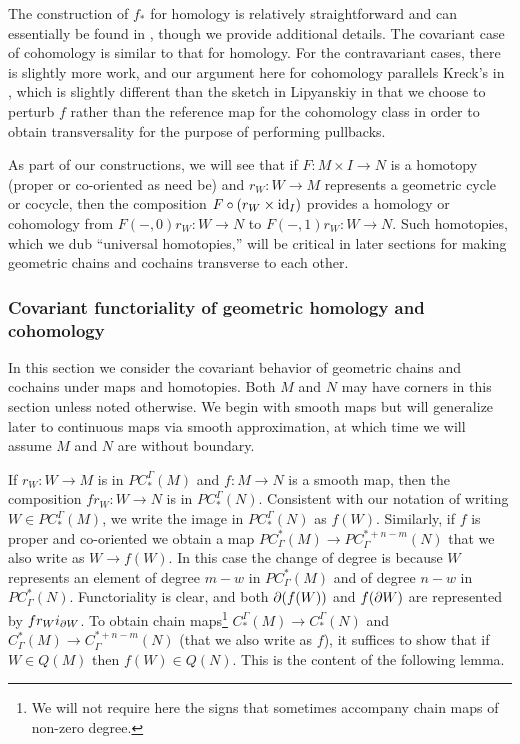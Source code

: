 The construction of $f_*$ for homology is relatively straightforward and can essentially be found in \cite[Section 6]{Lipy14}, though we provide additional details.
The covariant case of cohomology is similar to that for homology.
For the contravariant cases, there is slightly more work, and our argument here for cohomology parallels Kreck's in \cite{Krec10}, which is slightly different than the sketch in Lipyanskiy \cite[Section 6]{Lipy14} in that we choose to perturb $f$ rather than the reference map for the cohomology class in order to obtain transversality for the purpose of performing pullbacks.

As part of our constructions, we will see that if $F \colon M \times I \to N$ is a homotopy (proper or co-oriented as need be) and $r_W \colon W \to M$ represents a geometric cycle or cocycle, then the composition $F \circ (r_W \times \mathrm{id}_I)$ provides a homology or cohomology from $F(-,0)r_W \colon W \to N$ to $F(-,1)r_W \colon W \to N$.
Such homotopies, which we dub ``universal homotopies,'' will be critical in later sections for making geometric chains and cochains transverse to each other.

\subsubsection{Covariant functoriality of geometric homology and cohomology}\label{S: covariant functoriality}

In this section we consider the covariant behavior of geometric chains and cochains under maps and homotopies.
Both $M$ and $N$ may have corners in this section unless noted otherwise.
We begin with smooth maps but will generalize later to continuous maps via smooth approximation, at which time we will assume $M$ and $N$ are without boundary.

If $r_W \colon W \to M$ is in $PC_*^\Gamma(M)$ and $f \colon M \to N$ is a smooth map, then the composition $fr_W \colon W \to N$ is in $PC^\Gamma_*(N)$.
Consistent with our notation of writing $W \in PC_*^\Gamma(M)$, we write the image in $PC_*^\Gamma(N)$ as $f(W)$.
Similarly, if $f$ is proper and co-oriented we obtain a map $PC^*_\Gamma(M) \to PC^{*+n-m}_\Gamma(N)$ that we also write as $W \to f(W)$.
In this case the change of degree is because $W$ represents an element of degree $m-w$ in $PC^*_\Gamma(M)$ and of degree $n-w$ in $PC^{*}_\Gamma(N)$.
Functoriality is clear, and both $\partial(f(W))$ and $f(\partial W)$ are represented by $fr_Wi_{\partial W}$.
To obtain chain maps\footnote{We will not require here the signs that sometimes accompany chain maps of non-zero degree.} $C_*^\Gamma(M) \to C_*^\Gamma(N)$ and $C^*_\Gamma(M) \to C^{*+n-m}_\Gamma(N)$
(that we also write as $f$), it suffices to show that if $W \in Q(M)$ then $f(W) \in Q(N)$.
This is the content of the following lemma.

